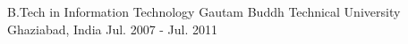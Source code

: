 

\begin{cventries}

  \cventry
    {B.Tech in Information Technology} %
    {Gautam Buddh Technical University} %
    {Ghaziabad, India} %
    {Jul. 2007 - Jul. 2011} %
    {
    }

\end{cventries}
